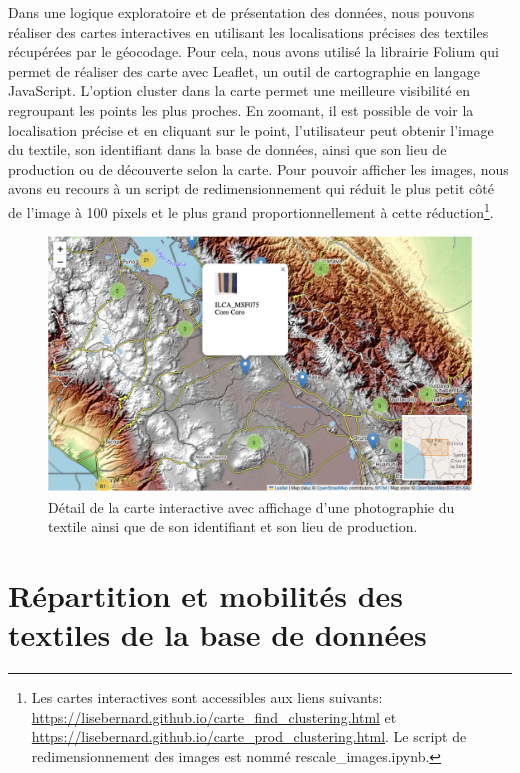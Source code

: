 Dans une logique exploratoire et de présentation des données, nous pouvons réaliser des cartes interactives en utilisant les localisations précises des textiles récupérées par le géocodage. Pour cela, nous avons utilisé la librairie Folium qui permet de réaliser des carte avec Leaflet, un outil de cartographie en langage JavaScript. L'option \og cluster \fg \: dans la carte permet une meilleure visibilité en regroupant les points les plus proches. En zoomant, il est possible de voir la localisation précise et en cliquant sur le point, l'utilisateur peut obtenir l'image du textile, son identifiant dans la base de données, ainsi que son lieu de production ou de découverte selon la carte.
Pour pouvoir afficher les images, nous avons eu recours à un script de redimensionnement qui réduit le plus petit côté de l'image à 100 pixels et le plus grand proportionnellement à cette réduction\footnote{Les cartes interactives sont accessibles aux liens suivants: \url{https://lisebernard.github.io/carte_find_clustering.html} et \url{https://lisebernard.github.io/carte_prod_clustering.html}. Le script de redimensionnement des images est nommé rescale\_images.ipynb.}.

\begin{figure}[!h]
	\begin{center}
		\includegraphics[width=12cm]{../images/carte_leaflet2.png}
		\caption{Détail de la carte interactive avec affichage d'une photographie du textile ainsi que de son identifiant et son lieu de production.}
		\label{fig:leaflet}
	 \end{center}
\end{figure}

\clearpage


\section{Répartition et mobilités des textiles de la base de données}

